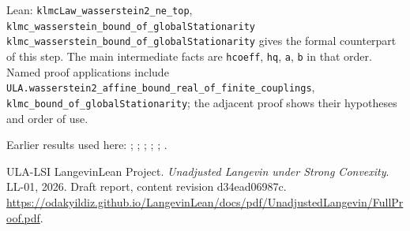 \documentclass[11pt,a4paper]{article}
\begin{document}
\begin{leanbox}{Lean: \texttt{klmcLaw\_\allowbreak{}wasserstein2\_\allowbreak{}ne\_\allowbreak{}top}, \texttt{klmc\_\allowbreak{}wasserstein\_\allowbreak{}bound\_\allowbreak{}of\_\allowbreak{}globalStationarity}}
\texttt{klmc\_\allowbreak{}wasserstein\_\allowbreak{}bound\_\allowbreak{}of\_\allowbreak{}global\allowbreak{}Stationarity} gives the formal counterpart of this step. The main intermediate facts are \texttt{hcoeff}, \texttt{hq}, \texttt{a}, \texttt{b} in that order. Named proof applications include \texttt{ULA.\allowbreak{}wasserstein2\_\allowbreak{}affine\_\allowbreak{}bound\_\allowbreak{}real\_\allowbreak{}of\_\allowbreak{}finite\_\allowbreak{}couplings}, \texttt{klmc\_\allowbreak{}bound\_\allowbreak{}of\_\allowbreak{}global\allowbreak{}Stationarity}; the adjacent proof shows their hypotheses and order of use.
\end{leanbox}


Earlier results used here: \cite[Section~3.17.1]{LangevinLean2026ULASC}; \cite[Section~3.17.12]{LangevinLean2026ULASC}; \cite[Section~3.17.3]{LangevinLean2026ULASC}; \cite[Section~3.17.4]{LangevinLean2026ULASC}; \cite[Section~3.18.2]{LangevinLean2026ULASC}; \cite[Section~3.18.4]{LangevinLean2026ULASC}.

\begin{thebibliography}{ULA-LSI}
LangevinLean Project. \emph{Unadjusted Langevin under Strong Convexity}. LL-01, 2026. Draft report, content revision d34ead06987c. \url{https://odakyildiz.github.io/LangevinLean/docs/pdf/UnadjustedLangevin/FullProof.pdf}.
\end{thebibliography}
\end{document}
